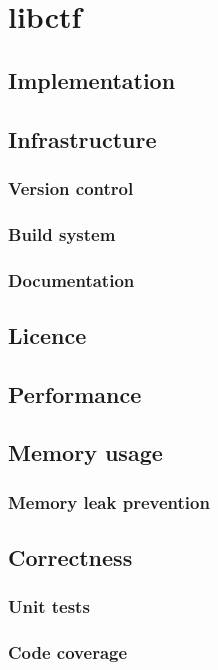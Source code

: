 \chapter{libctf}

\section{Implementation}
\section{Infrastructure}
\subsection{Version control}
\subsection{Build system}
\subsection{Documentation}
\section{Licence}
\section{Performance}
\section{Memory usage}
\subsection{Memory leak prevention}
\section{Correctness}
\subsection{Unit tests}
\subsection{Code coverage}

